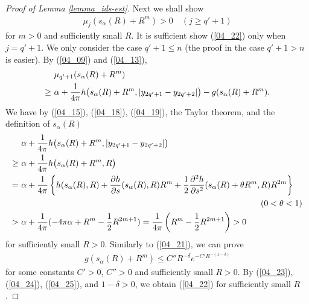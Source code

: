 \documentclass[12pt,a4paper]{article}
\begin{document}
\begin{proof}[Proof of Lemma \ref{lemma_ids-est}]
Next we shall show
\begin{align}
\label{04_22}
 \mu_j(s_{\alpha}(R)+R^m)>0\quad (j\geq q'+1)
\end{align}
for $m>0$ and sufficiently small $R$.
It is sufficient show (\ref{04_22}) only when $j=q'+1$.
We only consider the case $q'+1 \leq n$
(the proof in the case $q'+1>n$ is easier).
By (\ref{04_09}) and (\ref{04_13}),
\begin{align}
&\  \mu_{q'+1}(s_{\alpha}(R)+R^m)\notag\\
\geq &\ 
\alpha + \frac{1}{4\pi}h\bigl(s_{\alpha}(R)+R^m, |y_{2q'+1}-y_{2q'+2}|\bigr)
-g(s_{\alpha}(R)+R^m).
\label{04_23}
\end{align}
We have by (\ref{04_15}),
(\ref{04_18}), (\ref{04_19}),
the Taylor theorem,
and the definition of $s_\alpha(R)$
\begin{align}
&\ 
\alpha+ \frac{1}{4\pi}h\bigl(s_{\alpha}(R)+R^m, |y_{2q'+1}-y_{2q'+2}|\bigr)\notag\\
\geq &\ 
\alpha+ \frac{1}{4\pi}h\bigl(s_{\alpha}(R)+R^m, R\bigr)\notag\\
=&\ 
\alpha
+
\frac{1}{4\pi}
\left\{h(s_\alpha(R),R)
+\frac{\partial h}{\partial s}
(s_\alpha(R),R)R^m
+
\frac{1}{2}\frac{\partial^2 h}{\partial s^2}(s_\alpha(R)+\theta R^m,R)R^{2m}
\right\}\notag\\
&\ \hspace{10cm}
(0<\theta<1)\notag\\
>&\ 
\alpha+\frac{1}{4\pi}(-4\pi \alpha +R^m-\frac{1}{2}R^{2m+1})
=\frac{1}{4\pi}\left(R^m - \frac{1}{2}R^{2m+1}\right)>0
\label{04_24}
\end{align}
for sufficiently small $R>0$.
Similarly to (\ref{04_21}),
we can prove 
\begin{align}
  g(s_\alpha(R)+R^m)
\leq C'' R^{-\delta}e^{-C'R^{-(1-\delta)}}
\label{04_25}
\end{align}
for some constants $C'>0$, $C''>0$ and 
sufficiently small $R>0$.
By (\ref{04_23}), (\ref{04_24}), (\ref{04_25}), and $1-\delta>0$,
we obtain (\ref{04_22}) for sufficiently small $R$.


\end{proof}
\end{document}
